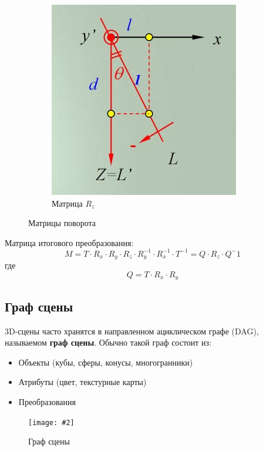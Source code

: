 \documentclass[a4paper, 14pt]{extarticle}
\newcommand{\screenshot}[3]{
	\begin{figure}[h]
		\centering
		\texttt{[image: \#2]}
		\caption{#3}
	\end{figure}
}
\begin{document}
\begin{figure}[h]
\begin{subfigure}[b]{0.3\textwidth}
		\centering
		\includegraphics[width=\textwidth]{l4/S019.jpg}
		\caption{Матрица $R_z$}
	\end{subfigure}
	\caption{Матрицы поворота}
\end{figure}
Матрица итогового преобразования:
$$
M = T \cdot R_x \cdot R_y \cdot R_z \cdot R_y^{-1} \cdot R_x^{-1} \cdot T^{-1} = Q \cdot R_z \cdot Q^-1
$$
где
$$Q=T \cdot R_x \cdot R_y$$

\subsection{Граф сцены}
3D-сцены часто хранятся в направленном ациклическом графе (DAG), называемом \textbf{граф сцены}. Обычно такой граф состоит из:
\begin{itemize}
	\item Объекты (кубы, сферы, конусы, многогранники)
	\item Атрибуты (цвет, текстурные карты)
	\item Преобразования
\end{itemize}
\screenshot{width=\textwidth}{l4/S020.jpg}{Граф сцены}
\end{document}
